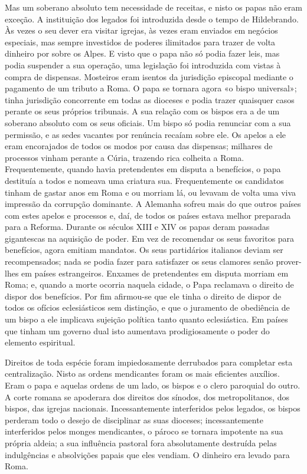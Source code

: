 \documentclass[11pt,a5paper,twoside,openany]{book}
\begin{document}
Mas um soberano absoluto tem necessidade de receitas, e nisto os papas não eram exceção. A instituição dos legados foi introduzida desde o tempo de Hildebrando. Às vezes o seu dever era visitar igrejas, às vezes eram enviados em negócios especiais, mas sempre investidos de poderes ilimitados para trazer de volta dinheiro por sobre os Alpes. E visto que o papa não só podia fazer leis, mas podia suspender a sua operação, uma legislação foi introduzida com vistas à compra de dispensas. Mosteiros eram isentos da jurisdição episcopal mediante o pagamento de um tributo a Roma. O papa se tornara agora «o bispo universal»; tinha jurisdição concorrente em todas as dioceses e podia trazer quaisquer casos perante os seus próprios tribunais. A sua relação com os bispos era a de um soberano absoluto com os seus oficiais. Um bispo só podia renunciar com a sua permissão, e as sedes vacantes por renúncia recaíam sobre ele. Os apelos a ele eram encorajados de todos os modos por causa das dispensas; milhares de processos vinham perante a Cúria, trazendo rica colheita a Roma. Frequentemente, quando havia pretendentes em disputa a benefícios, o papa destituía a todos e nomeava uma criatura sua. Frequentemente os candidatos tinham de gastar anos em Roma e ou morriam lá, ou levavam de volta uma viva impressão da corrupção dominante. A Alemanha sofreu mais do que outros países com estes apelos e processos e, daí, de todos os países estava melhor preparada para a Reforma. Durante os séculos XIII e XIV os papas deram passadas gigantescas na aquisição de poder. Em vez de recomendar os seus favoritos para benefícios, agora emitiam mandatos. Os seus partidários italianos deviam ser recompensados; nada se podia fazer para satisfazer os seus clamores senão prover-lhes em países estrangeiros. Enxames de pretendentes em disputa morriam em Roma; e, quando a morte ocorria naquela cidade, o Papa reclamava o direito de dispor dos benefícios. Por fim afirmou-se que ele tinha o direito de dispor de todos os ofícios eclesiásticos sem distinção, e que o juramento de obediência de um bispo a ele implicava sujeição política tanto quanto eclesiástica. Em países que tinham um governo dual isto aumentava prodigiosamente o poder do elemento espiritual.

Direitos de toda espécie foram impiedosamente derrubados para completar esta centralização. Nisto as ordens mendicantes foram os mais eficientes auxílios. Eram o papa e aquelas ordens de um lado, os bispos e o clero paroquial do outro. A corte romana se apoderara dos direitos dos sínodos, dos metropolitanos, dos bispos, das igrejas nacionais. Incessantemente interferidos pelos legados, os bispos perderam todo o desejo de disciplinar as suas dioceses; incessantemente interferidos pelos monges mendicantes, o pároco se tornara impotente na sua própria aldeia; a sua influência pastoral fora absolutamente destruída pelas indulgências e absolvições papais que eles vendiam. O dinheiro era levado para Roma.
\end{document}
